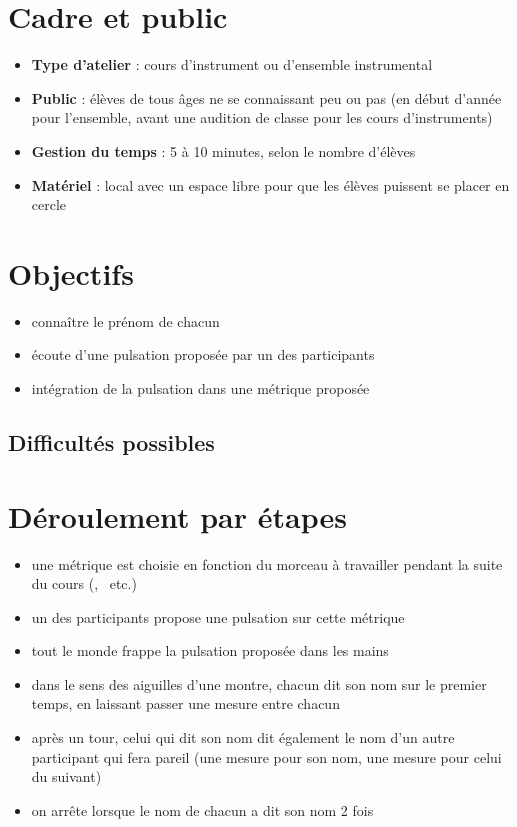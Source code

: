 \documentclass[a4paper,11pt,bibliography=totoc,numbers=noenddot,listof=flat,DIV=11,BCOR=0mm]{scrreprt}%
\begin{document}
\section*{Cadre et public}
\begin{itemize}
\item [\textbullet]\textbf{Type d'atelier} : cours d'instrument ou d'ensemble instrumental

\item [\textbullet]\textbf{Public} : élèves de tous âges ne se connaissant peu ou pas (en début d'année pour l'ensemble, avant une audition de classe pour les cours d'instruments)

\item [\textbullet]\textbf{Gestion du temps} : 5 à 10 minutes, selon le nombre d'élèves

\item [\textbullet]\textbf{Matériel} : local avec un espace libre pour que les élèves puissent se placer en cercle
\end{itemize}

\section*{Objectifs}
\begin{itemize}
\item connaître le prénom de chacun
\item écoute d'une pulsation proposée par un des participants
\item intégration de la pulsation dans une métrique proposée
\end{itemize}

\subsection*{Difficultés possibles}

\section*{Déroulement par étapes}
\begin{itemize}
\item une métrique est choisie en fonction du morceau à travailler pendant la suite du cours (, ~etc.) 
\item un des participants propose une pulsation sur cette métrique
\item tout le monde frappe la pulsation proposée dans les mains
\item dans le sens des aiguilles d'une montre, chacun dit son nom sur le premier temps, en laissant passer une mesure entre chacun
\item après un tour, celui qui dit son nom dit également le nom d'un autre participant qui fera pareil (une mesure pour son nom, une mesure pour celui du suivant)
\item on arrête lorsque le nom de chacun a dit son nom 2 fois
\end{itemize}
\end{document}
